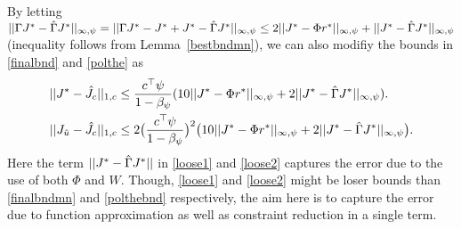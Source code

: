 \begin{note}
By letting $||\Gamma J^*-\hat{\Gamma} J^*||_{\infty,\psi}=||\Gamma J^*-J^*+J^*-\hat{\Gamma} J^*||_{\infty,\psi}\leq 2||J^*-\Phi r^*||_{\infty,\psi}+||J^*-\hat{\Gamma} J^*||_{\infty,\psi}$ (inequality follows from Lemma~\ref{bestbndmn}), we can also modifiy the bounds in \eqref{finalbnd} and \eqref{polthe} as
\begin{align}
\label{loose1}||J^*-\hj||_{1,c}&\leq\frac{c^\top\psi}{1-\beta_\psi}(10 ||J^*-\Phi r^*||_{\mn}
+2||J^*-\hg J^*||_{\mn}).\\
\label{loose2}||J_{\hu}-\hj||_{1,c}&\leq 2\big(\frac{c^\top \psi}{1-\beta_{\psi}}\big)^2 \big(10 ||J^*-\Phi r^*||_{\mn}
+2||J^*-\hg J^*||_{\mn}\big).
\end{align}
Here the term $||J^*-\hat{\Gamma} J^*||$ in \eqref{loose1} and \eqref{loose2} captures the error due to the use of both $\Phi$ and $W$. Though, \eqref{loose1} and \eqref{loose2} might be loser bounds than \eqref{finalbndmn} and \eqref{polthebnd} respectively, the aim here is to capture the error due to function approximation as well as constraint reduction in a single term.
\end{note}


